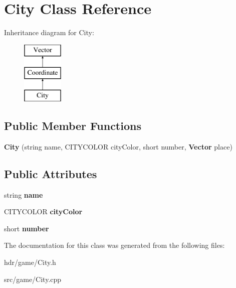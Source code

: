\section{City Class Reference}
\label{class_city}
Inheritance diagram for City\-:\begin{figure}[H]
\begin{center}
\leavevmode
\includegraphics[height=3.000000cm]{class_city}
\end{center}
\end{figure}
\subsection*{Public Member Functions}
\begin{DoxyCompactItemize}
\item 
{\bfseries City} (string name, C\-I\-T\-Y\-C\-O\-L\-O\-R city\-Color, short number, {\bf Vector} place)\label{class_city_af69b36738ed2df6478425bc98db7e316}

\end{DoxyCompactItemize}
\subsection*{Public Attributes}
\begin{DoxyCompactItemize}
\item 
string {\bfseries name}\label{class_city_a38b5e8b9bd4e263434eae0344913d341}

\item 
C\-I\-T\-Y\-C\-O\-L\-O\-R {\bfseries city\-Color}\label{class_city_ab73caf9c637e75630ec92ed6dd34e0d5}

\item 
short {\bfseries number}\label{class_city_a0fecf97dc1cbd61bb1bd27325decad52}

\end{DoxyCompactItemize}


The documentation for this class was generated from the following files\-:\begin{DoxyCompactItemize}
\item 
hdr/game/City.\-h\item 
src/game/City.\-cpp\end{DoxyCompactItemize}
